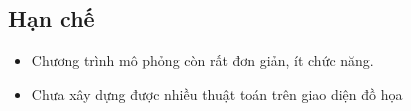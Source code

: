 \documentclass[a4paper,10pt]{article}
\begin{document}
\subsection{Hạn chế}
\begin{itemize}
\item Chương trình mô phỏng còn rất đơn giản, ít chức năng.
\item Chưa xây dựng được nhiều thuật toán trên giao diện đồ họa
\end{itemize}
\end{document}
